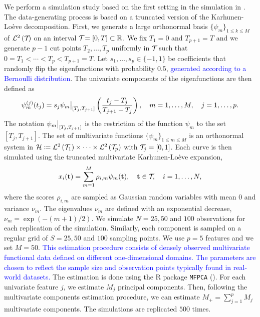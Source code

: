 We perform a simulation study based on the first setting in the simulation in \cite{happMultivariateFunctionalPrincipal2018}. The data-generating process is based on a truncated version of the Karhunen-Loève decomposition. First, we generate a large orthonormal basis $\{\psi_m\}_{1 \leq k \leq M}$ of $\mathcal{L}^{2}\left(\mathcal{T}_{}\right)$ on an interval $\mathcal{T}_{} = [0, T] \subset \mathbb{R}$. We fix $T_1 = 0$ and $T_{p + 1} = T$ and we generate $p - 1$ cut points $T_2, \dots, T_p$ uniformly in $\mathcal{T}_{}$ such that $0 = T_1 < \cdots < T_p < T_{p+1} = T$. Let $s_1, \dots, s_p \in \{-1, 1\}$ be coefficients that randomly flip the eigenfunctions with probability $0.5$, \textcolor{blue}{generated according to a Bernoulli distribution}. The univariate components of the eigenfunctions are then defined as
\begin{equation}\label{eq:simulation_uni_component}
    \psi_m^{(j)}(t_j) = s_j \restr{\psi_m}{[T_j, T_{j + 1}]}\left(\frac{t_j - T_j}{T_{j + 1} - T_j}\right), \quad m = 1, \dots, M, \quad j = 1, \dots, p.
\end{equation}
The notation $\restr{\psi_m}{[T_j, T_{j + 1}]}$ is the restriction of the function $\psi_m$ to the set $[T_j, T_{j + 1}]$. The set of multivariate functions $\{\psi_m\}_{1 \leq m \leq M}$ is an orthonormal system in $\mathcal{H} \coloneqq \mathcal{L}^{2}\left(\mathcal{T}_{1}\right) \times \dots \times \mathcal{L}^{2}\left(\mathcal{T}_{p}\right)$ with $\mathcal{T}_{j} = [0, 1]$. Each curve is then simulated using the truncated multivariate Karhunen-Loève expansion,
\begin{equation}
    x_i(\mathbf{t}) = \sum_{m = 1}^M \rho_{i, m} \psi_m(\mathbf{t}), \quad \mathbf{t} \in \mathcal{T}_{},\quad i = 1, \dots, N,
\end{equation}
where the scores $\rho_{i, m}$ are sampled as Gaussian random variables with mean $0$ and variance $\nu_m$. The eigenvalues $\nu_m$ are defined with an exponential decrease, $\nu_m = \exp(-(m + 1)/2)$. We simulate $N = 25, 50$ and $100$ observations for each replication of the simulation. Similarly, each component is sampled on a regular grid of $S = 25, 50$ and $100$ sampling points. We use $p = 5$ features and we set $M = 50$. \textcolor{blue}{This estimation procedure consists of densely observed multivariate functional data defined on different one-dimensional domains. The parameters are chosen to reflect the sample size and observation points typically found in real-world datasets.} The estimation is done using the \textsf{R} package \texttt{MFPCA} (\cite{happ-kurzObjectOrientedSoftwareFunctional2020}). For each univariate feature $j$, we estimate $M_j$ principal components. Then, following the multivariate components estimation procedure, we can estimate $M_+ = \sum_{j = 1}^p M_j$ multivariate components. The simulations are replicated $500$ times.

